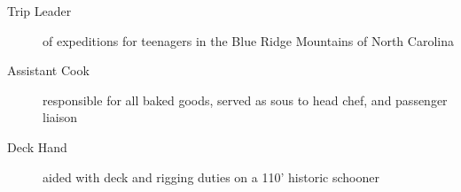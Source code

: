 \documentclass[a4paper]{deedy-resume} %
\begin{document}
    \iftrue

    \begin{description}
        \item[Trip Leader] of expeditions for teenagers in the Blue Ridge Mountains of North Carolina
    
    \iffalse 
    \begin{itemize}
        \item planned and guided backpacking trips
        \item responded to any medical issues
        \item drove passenger van with gear trailer
    \end{itemize}
    
    \fi
    \end{description}

    \sectionspace %

    \fi

    
    \iftrue
    
    \begin{description}
    \item[Assistant Cook] responsible for all baked goods, served as sous to head chef, and passenger liaison 
    
    \iffalse 
    \begin{itemize}
        \item baked bread, snacks, desserts and pastries starting at 4:30am
        \item washed all dishes and clean galley every night
        \item shopped for 6 days of provisions for 36 people and accommodated food allergies when needed
    \end{itemize}
    \fi

    \item[Deck Hand] aided with deck and rigging duties on a 110' historic schooner
    
    \iffalse 
    \begin{itemize}
        \item assisted throughout 10 day sail from Maine to Boston
        \item thorough knowledge of the rigging of sailboats both layout and use
        \item person overboard rescue procedures
    \end{itemize}
    \fi

    \end{description}
\end{document}
